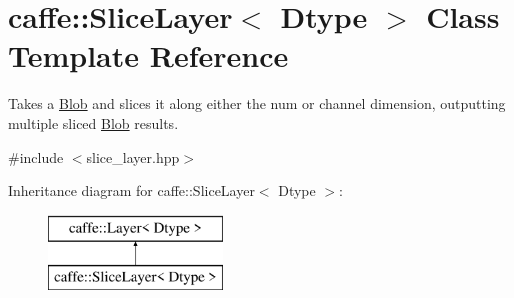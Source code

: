 \hypertarget{classcaffe_1_1SliceLayer}{}\section{caffe\+:\+:Slice\+Layer$<$ Dtype $>$ Class Template Reference}
\label{classcaffe_1_1SliceLayer}


Takes a \hyperlink{classcaffe_1_1Blob}{Blob} and slices it along either the num or channel dimension, outputting multiple sliced \hyperlink{classcaffe_1_1Blob}{Blob} results.  




{\ttfamily \#include $<$slice\+\_\+layer.\+hpp$>$}

Inheritance diagram for caffe\+:\+:Slice\+Layer$<$ Dtype $>$\+:\begin{figure}[H]
\begin{center}
\leavevmode
\includegraphics[height=2.000000cm]{classcaffe_1_1SliceLayer}
\end{center}
\end{figure}
